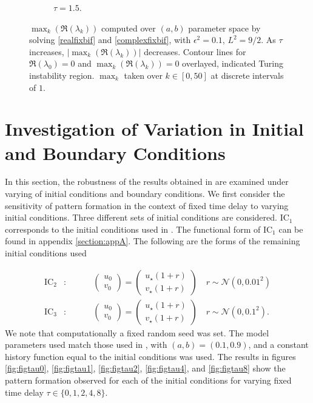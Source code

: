\begin{figure}[H]
\begin{subfigure}[b]{0.45\textwidth}
        \caption{$\tau=1.5$.}
        \label{}
    \end{subfigure}
    \caption{$\max_k(\Re(\lambda_k))$ computed over $(a,b)$ parameter space by solving \eqref{realfixbif} and \eqref{complexfixbif}, with $\epsilon^2=0.1$, $L^2=9/2$. As $\tau$ increases, $|\max_k(\Re(\lambda_k))|$ decreases. Contour lines for $\Re(\lambda_0)=0$ and $\max_k(\Re(\lambda_k))=0$ overlayed, indicated Turing instability region. $\max_k$ taken over $k\in[0, 50]$ at discrete intervals of $1$.}
    \label{fig:fixbif2}
\end{figure}
\section{Investigation of Variation in Initial and Boundary Conditions}
In this section, the robustness of the results obtained in \cite{gaffmonk} are examined under varying of initial conditions and boundary conditions. We first consider the sensitivity of pattern formation in the context of fixed time delay to varying initial conditions. Three different sets of initial conditions are considered. $\text{IC}_1$ corresponds to the initial conditions used in \cite{gaffmonk}. The functional form of $\text{IC}_1$ can be found in appendix \ref{section:appA}. The following are the forms of the remaining initial conditions used

\begin{align}\label{ICs}
\text{IC}_2&:\quad\quad\quad\begin{pmatrix}u_0\\v_0\end{pmatrix}=\begin{pmatrix}u_\star(1+r)\\v_\star(1+r)\end{pmatrix}\quad r\sim\mathcal{N}\left(0,0.01^2\right)\\
\text{IC}_3&:\quad\quad\quad\begin{pmatrix}u_0\\v_0\end{pmatrix}=\begin{pmatrix}u_\star(1+r)\\v_\star(1+r)\end{pmatrix}\quad r\sim\mathcal{N}\left(0,0.1^2\right).
\end{align}
We note that computationally a fixed random seed was set. The model parameters used match those used in \cite{gaffmonk}, with $(a,b)=(0.1,0.9)$, and a constant history function equal to the initial conditions was used. The results in figures \ref{fig:figtau0}, \ref{fig:figtau1}, \ref{fig:figtau2}, \ref{fig:figtau4}, and \ref{fig:figtau8} show the pattern formation observed for each of the initial conditions for varying fixed time delay $\tau\in\{0,1,2,4,8 \}$.

